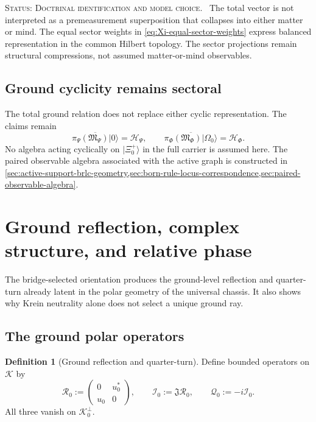 \documentclass[11pt,reqno]{scrartcl}
\newcommand{\scrK}{\mathscr K}
\newcommand{\scrHP}{\mathscr H_{\Psi}}
\newcommand{\scrHF}{\mathscr H_{\Phi}}
\newcommand{\algP}{\mathfrak M_{\Psi}}
\newcommand{\algF}{\mathfrak M_{\Phi}}
\newcommand{\piP}{\pi_{\Psi}}
\newcommand{\piF}{\pi_{\Phi}}
\newcommand{\fundJ}{\mathfrak J}
\newcommand{\Kzero}{\mathscr K_{0}}
\newcommand{\uzero}{u_{0}}
\newcommand{\Rzero}{\mathcal R_{0}}
\newcommand{\Izero}{\mathcal I_{0}}
\newcommand{\Qzero}{\mathcal Q_{0}}
\newcommand{\ket}[1]{\lvert #1\rangle}
\newcommand{\statuslabel}[1]{\par\smallskip\noindent\textsc{Status: #1.}\ }
\theoremstyle{plain}
\theoremstyle{definition}
\newtheorem{definition}[definition]{Definition}
\theoremstyle{remark}
\begin{document}
\statuslabel{Doctrinal identification and model choice} The total vector is
not interpreted as a premeasurement superposition that collapses into either
matter or mind.  The equal sector weights in
\eqref{eq:Xi-equal-sector-weights} express balanced representation in the
common Hilbert topology.  The sector projections remain structural
compressions, not assumed matter-or-mind observables.

\subsection{Ground cyclicity remains sectoral}

The total ground relation does not replace either cyclic representation.
The claims remain
\begin{equation}
  \overline{\piP(\algP)\ket0}=\scrHP,
  \qquad
  \overline{\piF(\algF)\ket{\Omega_0}}=\scrHF.
  \label{eq:sectoral-cyclicity-retained}
\end{equation}
No algebra acting cyclically on \(\ket{\Xi_0^+}\) in the full carrier is
assumed here.  The paired observable algebra associated with the active graph
is constructed in
\cref{sec:active-support-brlc-geometry,sec:born-rule-locus-correspondence,sec:paired-observable-algebra}.
\section{Ground reflection, complex structure, and relative phase}
\label{sec:ground-reflection-phase}

The bridge-selected orientation produces the ground-level reflection and
quarter-turn already latent in the polar geometry of the universal chassis.
It also shows why Krein neutrality alone does not select a unique ground
ray.

\subsection{The ground polar operators}

\begin{definition}[Ground reflection and quarter-turn]
\label{def:ground-polar-operators}
Define bounded operators on \(\scrK\) by
\begin{equation}
  \boxed{
  \Rzero
  :=\begin{pmatrix}0&\uzero^*\\\uzero&0\end{pmatrix},
  \qquad
  \Izero:=\fundJ\Rzero,
  \qquad
  \Qzero:=-i\Izero.}
  \label{eq:ground-polar-operators}
\end{equation}
All three vanish on \(\Kzero^\perp\).
\end{definition}
\end{document}
